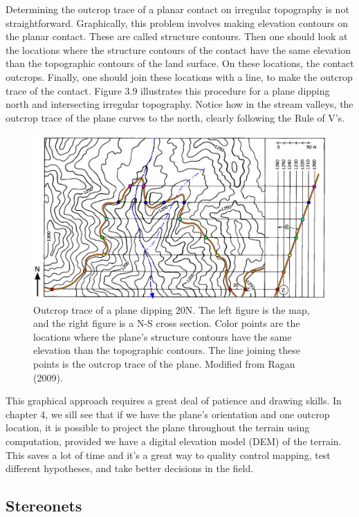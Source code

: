 \documentclass[a4paper , 12pt]{book}
\begin{document}
Determining the outcrop trace of a planar contact on irregular topography is not straightforward. Graphically, this problem involves making elevation contours on the planar contact. These are called structure contours. Then one should look at the locations where the structure contours of the contact have the same elevation than the topographic contours of the land surface. On these locations, the contact outcrops. Finally, one should join these locations with a line, to make the outcrop trace of the contact. Figure 3.9 illustrates this procedure for a plane dipping north and intersecting irregular topography. Notice how in the stream valleys, the outcrop trace of the plane curves to the north, clearly following the Rule of V’s.

\begin{figure}[ht]
    \centering
    \includegraphics[width=13cm]{Figures/ch3f9.png}
    \caption{Outcrop trace of a plane dipping 20\degree N. The left figure is the map, and the right figure is a N-S cross section. Color points are the locations where the plane's structure contours have the same elevation than the topographic contours. The line joining these points is the outcrop trace of the plane. Modified from Ragan (2009).}
\end{figure}

This graphical approach requires a great deal of patience and drawing skills. In chapter 4, we sill see that if we have the plane’s orientation and one outcrop location, it is possible to project the plane throughout the terrain using computation, provided we have a digital elevation model (DEM) of the terrain. This saves a lot of time and it’s a great way to quality control mapping, test different hypotheses, and take better decisions in the field.

\subsection{Stereonets}
\end{document}
